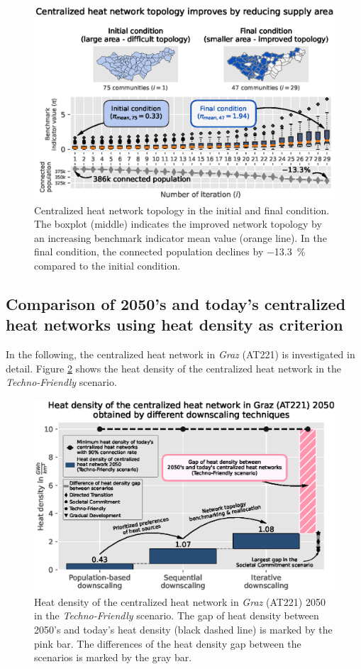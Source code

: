 \begin{figure}
	\centering
	\includegraphics[width=1\linewidth]{figures/4_Results/Fig_Boxplot/ext_boxplot.eps}
	\caption{Centralized heat network topology in the initial and final condition. The boxplot (middle) indicates the improved network topology by an increasing benchmark indicator mean value (orange line). In the final condition, the connected population declines by \SI{-13.3}{\%} compared to the initial condition.}
	\label{fig:res3}
\end{figure}

\subsection{Comparison of 2050's and today's centralized heat networks using heat density as criterion}\label{res:5}
In the following, the centralized heat network in \textit{Graz} (AT221) is investigated in detail. Figure \ref{fig:res5} shows the heat density of the centralized heat network in the \textit{Techno-Friendly} scenario. 

\begin{figure}[h]
	\centering
	\includegraphics[width=1\linewidth]{figures/4_Results/Fig_Heat-density/HD_cleaned1.eps}
	\caption{Heat density of the centralized heat network in \textit{Graz} (AT221) 2050 in the \textit{Techno-Friendly} scenario. The gap of heat density between 2050's and today's heat density (black dashed line) is marked by the pink bar. The differences of the heat density gap between the scenarios is marked by the gray bar.}
	\label{fig:res5}
\end{figure}

